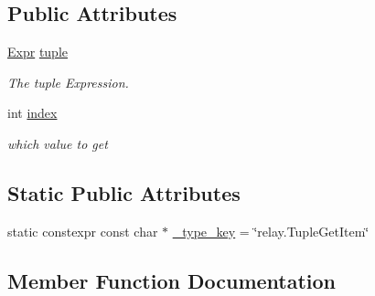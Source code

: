 \subsection*{Public Attributes}
\begin{DoxyCompactItemize}
\item 
\hyperlink{namespacetvm_1_1relay_a5b84e3790f89bb3fad5c7911eeb99531}{Expr} \hyperlink{classtvm_1_1relay_1_1TupleGetItemNode_aade4882f84d828975c689b5c6b1b68e6}{tuple}
\begin{DoxyCompactList}\small\item\em The tuple Expression. \end{DoxyCompactList}\item 
int \hyperlink{classtvm_1_1relay_1_1TupleGetItemNode_a72d32db7efcd228f67f27b632cf49cbc}{index}
\begin{DoxyCompactList}\small\item\em which value to get \end{DoxyCompactList}\end{DoxyCompactItemize}
\subsection*{Static Public Attributes}
\begin{DoxyCompactItemize}
\item 
static constexpr const char $\ast$ \hyperlink{classtvm_1_1relay_1_1TupleGetItemNode_ab961b65dea40152e3e8b1be66a20494e}{\+\_\+type\+\_\+key} = \char`\"{}relay.\+Tuple\+Get\+Item\char`\"{}
\end{DoxyCompactItemize}


\subsection{Member Function Documentation}
